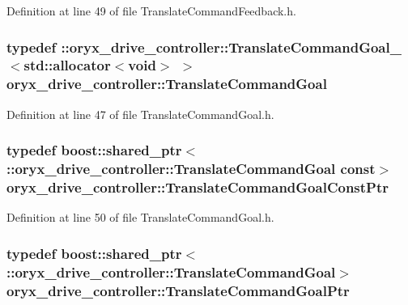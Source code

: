 \-Definition at line 49 of file \-Translate\-Command\-Feedback.\-h.

\subsubsection[{\-Translate\-Command\-Goal}]{\setlength{\rightskip}{0pt plus 5cm}typedef \-::{\bf oryx\-\_\-drive\-\_\-controller\-::\-Translate\-Command\-Goal\-\_\-}$<$std\-::allocator$<$void$>$ $>$ {\bf oryx\-\_\-drive\-\_\-controller\-::\-Translate\-Command\-Goal}}\label{namespaceoryx__drive__controller_a195e301def5f0fedc67194c7d9cbe0bd}


\-Definition at line 47 of file \-Translate\-Command\-Goal.\-h.

\subsubsection[{\-Translate\-Command\-Goal\-Const\-Ptr}]{\setlength{\rightskip}{0pt plus 5cm}typedef boost\-::shared\-\_\-ptr$<$ \-::{\bf oryx\-\_\-drive\-\_\-controller\-::\-Translate\-Command\-Goal} const$>$ {\bf oryx\-\_\-drive\-\_\-controller\-::\-Translate\-Command\-Goal\-Const\-Ptr}}\label{namespaceoryx__drive__controller_aa7a5aba5e401fc9d72c07dd489080fb9}


\-Definition at line 50 of file \-Translate\-Command\-Goal.\-h.

\subsubsection[{\-Translate\-Command\-Goal\-Ptr}]{\setlength{\rightskip}{0pt plus 5cm}typedef boost\-::shared\-\_\-ptr$<$ \-::{\bf oryx\-\_\-drive\-\_\-controller\-::\-Translate\-Command\-Goal}$>$ {\bf oryx\-\_\-drive\-\_\-controller\-::\-Translate\-Command\-Goal\-Ptr}}\label{namespaceoryx__drive__controller_acf160292bdc848bc83d0d7d886130bce}


